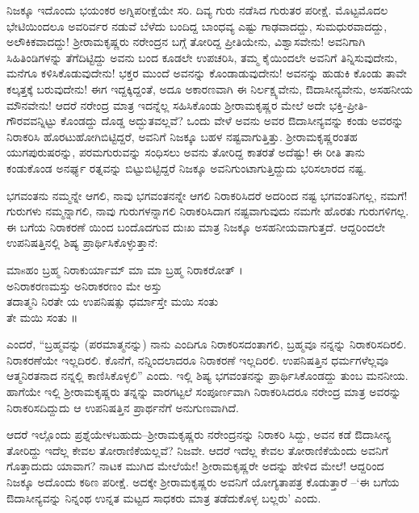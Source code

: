 ನಿಜಕ್ಕೂ ಇದೊಂದು ಭಯಂಕರ ಅಗ್ನಿಪರೀಕ್ಷೆಯೇ ಸರಿ. ದಿವ್ಯ ಗುರು ನಡೆಸಿದ ಗುರುತರ ಪರೀಕ್ಷೆ. ಮೊಟ್ಟಮೊದಲ ಭೇಟಿಯಿಂದಲೂ ಅವರಿರ್ವರ ನಡುವೆ ಬೆಳೆದು ಬಂದಿದ್ದ ಬಾಂಧವ್ಯ ಎಷ್ಟು ಗಾಢವಾದದ್ದು, ಸುಮಧುರವಾದದ್ದು, ಅಲೌಕಿಕವಾದದ್ದು! ಶ್ರೀರಾಮಕೃಷ್ಣರು ನರೇಂದ್ರನ ಬಗ್ಗೆ ತೋರಿದ್ದ ಪ್ರೀತಿಯೇನು, ವಿಶ್ವಾಸವೇನು! ಅವನಿಗಾಗಿ ಸಿಹಿತಿಂಡಿಗಳನ್ನು ತೆಗೆದಿಟ್ಟಿದ್ದು ಅವನು ಬಂದ ಕೂಡಲೇ ಉಪಚರಿಸಿ, ತಮ್ಮ ಕೈಯಿಂದಲೇ ಅವನಿಗೆ ತಿನ್ನಿಸುವುದೇನು, ಮನೆಗೂ ಕಳಿಸಿಕೊಡುವುದೇನು! ಭಕ್ತರ ಮುಂದೆ ಅವನನ್ನು ಕೊಂಡಾಡುವುದೇನು! ಅವನನ್ನು ಹುಡುಕಿ ಕೊಂಡು ತಾವೇ ಕಲ್ಕತ್ತಕ್ಕೆ ಬರುವುದೇನು! ಈಗ ಇದ್ದಕ್ಕಿದ್ದಂತೆ, ಅದೂ ಅಕಾರಣವಾಗಿ ಈ ನಿರ್ಲಕ್ಷ್ಯವೇನು, ಔದಾಸೀನ್ಯವೇನು, ಅಸಹನೀಯ ಮೌನವೇನು! ಆದರೆ ನರೇಂದ್ರ ಮಾತ್ರ ಇದನ್ನೆಲ್ಲ ಸಹಿಸಿಕೊಂಡು ಶ್ರೀರಾಮಕೃಷ್ಣರ ಮೇಲೆ ಅದೇ ಭಕ್ತಿ-ಪ್ರೀತಿ-ಗೌರವವನ್ನಿಟ್ಟು ಕೊಂಡದ್ದು ದೊಡ್ಡ ಅದ್ಭುತವಲ್ಲವೆ? ಒಂದು ವೇಳೆ ಅವನು ಅವರ ಔದಾಸೀನ್ಯವನ್ನು ಕಂಡು ಅವರನ್ನು ನಿರಾಕರಿಸಿ ಹೊರಟುಹೋಗಿಬಿಟ್ಟಿದ್ದರೆ, ಅವನಿಗೆ ನಿಜಕ್ಕೂ ಬಹಳ ನಷ್ಟವಾಗುತ್ತಿತ್ತು. ಶ್ರೀರಾಮಕೃಷ್ಣರಂತಹ ಯುಗಪುರುಷರನ್ನು, ಪರಮಗುರುವನ್ನು ಸಂಧಿಸಲು ಅವನು ತೋರಿದ್ದ ಕಾತರತೆ ಅದೆಷ್ಟು! ಈ ರೀತಿ ತಾನು ಕಂಡುಕೊಂಡ ಅನರ್ಘ್ಯ ರತ್ನವನ್ನು ಬಿಟ್ಟುಬಿಟ್ಟಿದ್ದರೆ ನಿಜಕ್ಕೂ ಅವನಿಗುಂಟಾಗುತ್ತಿದ್ದುದು ಭರಿಸಲಾರದ ನಷ್ಟ.

ಭಗವಂತನು ನಮ್ಮನ್ನೇ ಆಗಲಿ, ನಾವು ಭಗವಂತನನ್ನೇ ಆಗಲಿ ನಿರಾಕರಿಸಿದರೆ ಅದರಿಂದ ನಷ್ಟ ಭಗವಂತನಿಗಲ್ಲ, ನಮಗೆ! ಗುರುಗಳು ನಮ್ಮನ್ನಾಗಲಿ, ನಾವು ಗುರುಗಳನ್ನಾಗಲಿ ನಿರಾಕರಿಸಿದಾಗ ನಷ್ಟವಾಗುವುದು ನಮಗೇ ಹೊರತು ಗುರುಗಳಿಗಲ್ಲ. ಈ ಬಗೆಯ ನಿರಾಕರಣೆ ಯಿಂದ ಬಂದೊದಗುವ ದುಃಖ ಮಾತ್ರ ನಿಜಕ್ಕೂ ಅಸಹನೀಯವಾಗುತ್ತದೆ. ಆದ್ದರಿಂದಲೇ ಉಪನಿಷತ್ತಿನಲ್ಲಿ ಶಿಷ್ಯ ಪ್ರಾರ್ಥಿಸಿಕೊಳ್ಳುತ್ತಾನೆ:

\begin{myquote}
ಮಾsಹಂ ಬ್ರಹ್ಮ ನಿರಾಕುರ್ಯಾಮ್ ಮಾ ಮಾ ಬ್ರಹ್ಮ ನಿರಾಕರೋತ್ ।\\ಅನಿರಾಕರಣಮಸ್ತು ಅನಿರಾಕರಣಂ ಮೇ ಅಸ್ತು \\ತದಾತ್ಮನಿ ನಿರತೇ ಯ ಉಪನಿಷತ್ಸು ಧರ್ಮಾಸ್ತೇ ಮಯಿ ಸಂತು \\ತೇ ಮಯಿ ಸಂತು ॥
\end{myquote}

\noindent

ಎಂದರೆ, “ಬ್ರಹ್ಮವನ್ನು (ಪರಮಾತ್ಮನನ್ನು) ನಾನು ಎಂದಿಗೂ ನಿರಾಕರಿಸದಂತಾಗಲಿ, ಬ್ರಹ್ಮವೂ ನನ್ನನ್ನು ನಿರಾಕರಿಸದಿರಲಿ. ನಿರಾಕರಣೆಯೇ ಇಲ್ಲದಿರಲಿ. ಕೊನೆಗೆ, ನನ್ನಿಂದಲಾದರೂ ನಿರಾಕರಣೆ ಇಲ್ಲದಿರಲಿ. ಉಪನಿಷತ್ತಿನ ಧರ್ಮಗಳೆಲ್ಲವೂ ಆತ್ಮನಿರತನಾದ ನನ್ನಲ್ಲಿ ಕಾಣಿಸಿಕೊಳ್ಳಲಿ” ಎಂದು. ಇಲ್ಲಿ ಶಿಷ್ಯ ಭಗವಂತನನ್ನು ಪ್ರಾರ್ಥಿಸಿಕೊಂಡದ್ದು ತುಂಬ ಮನನೀಯ. ಹಾಗೆಯೇ ಇಲ್ಲಿ ಶ್ರೀರಾಮಕೃಷ್ಣರು ತನ್ನನ್ನು ವಾರಗಟ್ಟಲೆ ಸಂಪೂರ್ಣವಾಗಿ ನಿರಾಕರಿಸಿದರೂ ನರೇಂದ್ರ ಮಾತ್ರ ಅವರನ್ನು ನಿರಾಕರಿಸದಿದ್ದುದು ಆ ಉಪನಿಷತ್ತಿನ ಪ್ರಾರ್ಥನೆಗೆ ಅನುಗುಣವಾಗಿದೆ.

ಆದರೆ ಇಲ್ಲೊಂದು ಪ್ರಶ್ನೆಯೇಳಬಹುದು–ಶ್ರೀರಾಮಕೃಷ್ಣರು ನರೇಂದ್ರನನ್ನು ನಿರಾಕರಿ ಸಿದ್ದು, ಅವನ ಕಡೆ ಔದಾಸೀನ್ಯ ತೋರಿದ್ದು ಇದೆಲ್ಲ ಕೇವಲ ತೋರಾಣಿಕೆಯಲ್ಲವೆ? ನಿಜವೇ. ಆದರೆ ಇದೆಲ್ಲ ಕೇವಲ ತೋರಾಣಿಕೆಯೆಂದು ಅವನಿಗೆ ಗೊತ್ತಾದುದು ಯಾವಾಗ? ನಾಟಕ ಮುಗಿದ ಮೇಲೆಯೇ! ಶ್ರೀರಾಮಕೃಷ್ಣರೇ ಅದನ್ನು ಹೇಳಿದ ಮೇಲೆ! ಆದ್ದರಿಂದ ನಿಜಕ್ಕೂ ಅದೊಂದು ಕಠಿಣ ಪರೀಕ್ಷೆ. ಅದಕ್ಕೇ ಶ್ರೀರಾಮಕೃಷ್ಣರು ಅವನಿಗೆ ಯೋಗ್ಯತಾಪತ್ರ ಕೊಡುತ್ತಾರೆ –‘ಈ ಬಗೆಯ ಔದಾಸೀನ್ಯವನ್ನು ನಿನ್ನಂಥ ಉನ್ನತ ಮಟ್ಟದ ಸಾಧಕರು ಮಾತ್ರ ತಡೆದುಕೊಳ್ಳ ಬಲ್ಲರು’ ಎಂದು.

